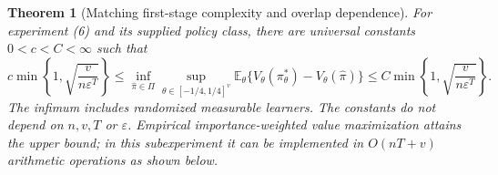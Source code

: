\documentclass[11pt]{article}
\newtheorem{theorem}{Theorem}
\theoremstyle{definition}
\begin{document}
\begin{theorem}[Matching first-stage complexity and overlap dependence]
For experiment (6) and its supplied policy class, there are universal
constants $0<c<C<\infty$ such that
\[
 c\min\left\{1,\sqrt{\frac{v}{n\varepsilon^T}}\right\}
 \le\inf_{\widehat\pi\in\Pi}\sup_{\theta\in[-1/4,1/4]^v}
 \mathbb E_\theta\{V_\theta(\pi_\theta^*)-
                                   V_\theta(\widehat\pi)\}
 \le C\min\left\{1,\sqrt{\frac{v}{n\varepsilon^T}}\right\}.
                                                        \tag{7}
\]
The infimum includes randomized measurable learners. The constants do
not depend on $n,v,T$ or $\varepsilon$. Empirical importance-weighted value maximization attains the upper
bound; in this subexperiment it can be implemented in $O(nT+v)$
arithmetic operations as shown below.
\end{theorem}
\end{document}
